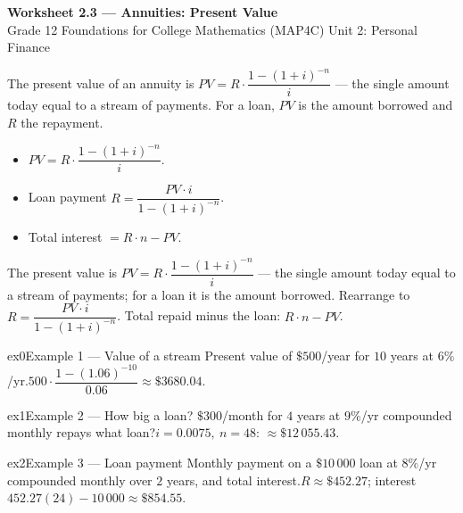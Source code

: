 \documentclass[11pt]{article}
\begin{document}
\begin{center}
{\LARGE\bfseries\color{titleblue}Worksheet 2.3 --- Annuities: Present Value}\\[2pt]
{\small Grade 12 Foundations for College Mathematics (MAP4C) \textperiodcentered{} Unit 2: Personal Finance}
\end{center}

\begin{ideabox}
The present value of an annuity is $PV=R\cdot\dfrac{1-(1+i)^{-n}}{i}$ — the single amount today equal to a stream of payments. For a loan, $PV$ is the amount borrowed and $R$ the repayment.
\begin{itemize}[leftmargin=*,itemsep=2pt]
  \item $PV=R\cdot\dfrac{1-(1+i)^{-n}}{i}$.
  \item Loan payment $R=\dfrac{PV\cdot i}{1-(1+i)^{-n}}$.
  \item Total interest $=R\cdot n-PV$.
\end{itemize}
\end{ideabox}

\begin{learnbox}
The present value is $PV=R\cdot\dfrac{1-(1+i)^{-n}}{i}$ — the single amount today equal to a stream of payments; for a loan it is the amount borrowed.
Rearrange to $R=\dfrac{PV\cdot i}{1-(1+i)^{-n}}$.
Total repaid minus the loan: $R\cdot n-PV$.
\end{learnbox}


\begin{example}{ex0}{Example 1 --- Value of a stream}
Present value of $\$500$/year for $10$ years at $6\%$/yr.\soln $500\cdot\dfrac{1-(1.06)^{-10}}{0.06}\approx\$3680.04$.
\end{example}

\begin{example}{ex1}{Example 2 --- How big a loan?}
$\$300$/month for $4$ years at $9\%$/yr compounded monthly repays what loan?\soln $i=0.0075,\ n=48$: $\approx\$12\,055.43$.
\end{example}

\begin{example}{ex2}{Example 3 --- Loan payment}
Monthly payment on a $\$10\,000$ loan at $8\%$/yr compounded monthly over $2$ years, and total interest.\soln $R\approx\$452.27$; interest $452.27(24)-10\,000\approx\$854.55$.
\end{example}
\end{document}
